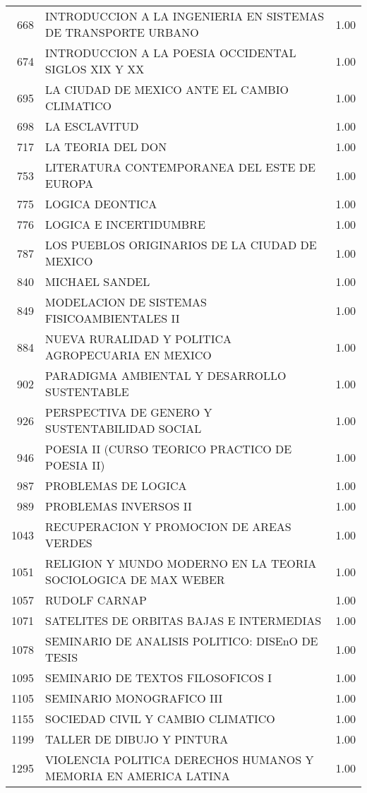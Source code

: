 \begin{table}[ht]
\begin{tabular}{rlr}
  668 & INTRODUCCION A LA INGENIERIA EN SISTEMAS DE TRANSPORTE URBANO & 1.00 \\ 
  674 & INTRODUCCION A LA POESIA OCCIDENTAL SIGLOS XIX Y XX & 1.00 \\ 
  695 & LA CIUDAD DE MEXICO ANTE EL CAMBIO CLIMATICO & 1.00 \\ 
  698 & LA ESCLAVITUD & 1.00 \\ 
  717 & LA TEORIA DEL DON & 1.00 \\ 
  753 & LITERATURA CONTEMPORANEA DEL ESTE DE EUROPA & 1.00 \\ 
  775 & LOGICA DEONTICA & 1.00 \\ 
  776 & LOGICA E INCERTIDUMBRE & 1.00 \\ 
  787 & LOS PUEBLOS ORIGINARIOS DE LA CIUDAD DE MEXICO & 1.00 \\ 
  840 & MICHAEL SANDEL & 1.00 \\ 
  849 & MODELACION DE SISTEMAS FISICOAMBIENTALES II & 1.00 \\ 
  884 & NUEVA RURALIDAD Y POLITICA AGROPECUARIA EN MEXICO & 1.00 \\ 
  902 & PARADIGMA AMBIENTAL Y DESARROLLO SUSTENTABLE & 1.00 \\ 
  926 & PERSPECTIVA DE GENERO Y SUSTENTABILIDAD SOCIAL & 1.00 \\ 
  946 & POESIA II (CURSO TEORICO PRACTICO DE POESIA II) & 1.00 \\ 
  987 & PROBLEMAS DE LOGICA & 1.00 \\ 
  989 & PROBLEMAS INVERSOS II & 1.00 \\ 
  1043 & RECUPERACION Y PROMOCION DE AREAS VERDES & 1.00 \\ 
  1051 & RELIGION Y MUNDO MODERNO EN LA TEORIA SOCIOLOGICA DE MAX WEBER & 1.00 \\ 
  1057 & RUDOLF CARNAP & 1.00 \\ 
  1071 & SATELITES DE ORBITAS BAJAS E INTERMEDIAS & 1.00 \\ 
  1078 & SEMINARIO DE ANALISIS POLITICO: DISEnO DE TESIS & 1.00 \\ 
  1095 & SEMINARIO DE TEXTOS FILOSOFICOS I & 1.00 \\ 
  1105 & SEMINARIO MONOGRAFICO III & 1.00 \\ 
  1155 & SOCIEDAD CIVIL Y CAMBIO CLIMATICO & 1.00 \\ 
  1199 & TALLER DE DIBUJO Y PINTURA & 1.00 \\ 
  1295 & VIOLENCIA POLITICA DERECHOS HUMANOS Y MEMORIA EN AMERICA LATINA & 1.00 \\ 

\end{tabular}
\end{table}
